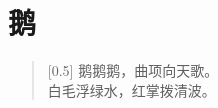 \documentclass[12pt,UTF-8,openany]{ctexbook}
\begin{document}
\hanzibox{}\hanzibox{}\hanzibox{}\hanzibox{}\hspace{1em}\hanzibox{}\hanzibox{}\hanzibox{}\hanzibox{}

\hanzibox{}\hanzibox{}\hanzibox{}\hanzibox{}\hspace{1em}\hanzibox{}\hanzibox{}\hanzibox{}\hanzibox{}






\chapter{鹅}

\begin{large}
    
    \begin{verse}[0.5\linewidth]
        \phantom{鹅}鹅鹅鹅\phantom{鹅}，曲项向天歌。 \\
        白毛浮绿水，红掌拨清波。
    \end{verse}
    
\end{large}


\clearpage

\begin{center}
    
\end{center}


\hanzibox{}\hanzibox{}\hanzibox{}\hanzibox{}\hspace{1em}\hanzibox{}\hanzibox{}\hanzibox{}\hanzibox{}

\hanzibox{}\hanzibox{}\hanzibox{}\hanzibox{}\hspace{1em}\hanzibox{}\hanzibox{}\hanzibox{}\hanzibox{}

\hanzibox{}\hanzibox{}\hanzibox{}\hanzibox{}\hspace{1em}\hanzibox{}\hanzibox{}\hanzibox{}\hanzibox{}

\hanzibox{}\hanzibox{}\hanzibox{}\hanzibox{}\hspace{1em}
\end{document}

